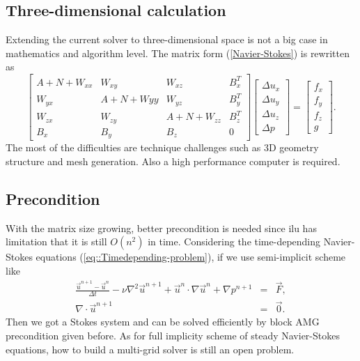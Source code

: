 \documentclass[a4paper]{article}
\begin{document}
\subsection{Three-dimensional calculation}
Extending the current solver to three-dimensional space is not a big
case in mathematics and algorithm level. The matrix form
(\ref{Navier-Stokes}) is rewritten as
\begin{equation}
\left[ \begin{array}{cccc}
A + N +W_{xx} & W_{xy} & W_{xz} & B_x^T \\
W_{yx} & A +N +W{yy}& W_{yz} & B_y^T \\
W_{zx} & W_{zy}  &A + N + W_{zz} & B_z^T \\
B_x & B_y &B_z& 0
\end{array}
\right]
\left[\begin{array}{cccc}
\Delta u_x\\
\Delta u_y\\
\Delta u_z\\
\Delta p
\end{array}
\right]=
\left[\begin{array}{cccc}
f_x\\
f_y\\
f_z\\
g
\end{array}
\right].
\label{3D-Navier-Stokes}
\end{equation}
The most of the difficulties are technique challenges such as 3D
geometry structure and mesh generation. Also a high performance computer is required.

\subsection{Precondition}
With the matrix size growing, better precondition is needed since ilu
has limitation that it is still $O(n^2)$ in time. Considering the
time-depending Navier-Stokes equations
(\ref{eq::Timedepending-problem}), if we use semi-implicit scheme like
\begin{equation}
\begin{array}{rcl}
\frac{\vec{u}^{n+1}-\vec{u}^n}{\Delta t} - \nu \nabla^2 \vec{u}^{n+1} + \vec{u}^{n}\cdot \nabla \vec{u}^n + \nabla p^{n+1} &=& \vec{F}, \\
\nabla \cdot \vec{u}^{n+1} &=& \vec{0}.
\label{eq::implicit and explicit}
\end{array}
\end{equation}
Then we got a Stokes system and can be solved efficiently by block AMG
precondition given before. As for full implicity scheme of steady
Navier-Stokes equations, how to build a multi-grid solver is still an
open problem.




\end{document}
